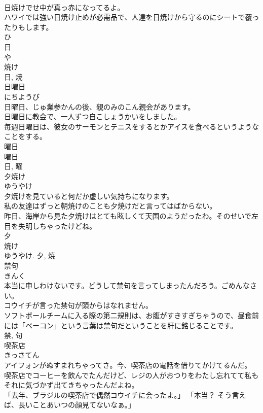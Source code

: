 \documentclass[8pt]{extreport}
\begin{document}
\begin{CJK}{UTF8}{min}
\\	日焼けでせ中が真っ赤になってるよ。	
\\	ハワイでは強い日焼け止めが必需品で、人達を日焼けから守るのにシートで覆ったりもします。	
\\	ひ 
\\	日 
\\	や 
\\	焼け 
\\	日, 焼	
\\	日曜日	
\\	にちようび	
\\	日曜日、じゅ業参かんの後、親のみのこん親会があります。	
\\	日曜日に教会で、一人ずつ自こしょうかいをしました。	
\\	毎週日曜日は、彼女のサーモンとテニスをするとかアイスを食べるというようなことをする。	
\\	曜日 
\\	曜日 
\\	日, 曜	
\\	夕焼け	
\\	ゆうやけ	
\\	夕焼けを見ていると何だか虚しい気持ちになります。	
\\	私の友達はずっと朝焼けのことも夕焼けだと言ってはばからない。	
\\	昨日、海岸から見た夕焼けはとても眩しくて天国のようだったわ。そのせいで左目を失明しちゃったけどね。	
\\	夕 
\\	焼け 
\\	ゆうやけ.	夕, 焼	
\\	禁句	
\\	きんく	
\\	本当に申しわけないです。どうして禁句を言ってしまったんだろう。ごめんなさい。	
\\	コウイチが言った禁句が頭からはなれません。	
\\	ソフトボールチームに入る際の第二規則は、お腹がすきすぎちゃうので、昼食前には「ベーコン」という言葉は禁句だということを肝に銘じることです。	
\\	禁, 句	
\\	喫茶店	
\\	きっさてん	
\\	アイフォンがぬすまれちゃってさ。今、喫茶店の電話を借りてかけてるんだ。	
\\	喫茶店でコーヒーを飲んでたんだけど、レジの人がおつりをわたし忘れてて私もそれに気づかず出てきちゃったんだよね。	
\\	「去年、ブラジルの喫茶店で偶然コウイチに会ったよ。」 「本当？ そう言えば、長いことあいつの顔見てないなぁ。」	

\end{CJK}
\end{document}
